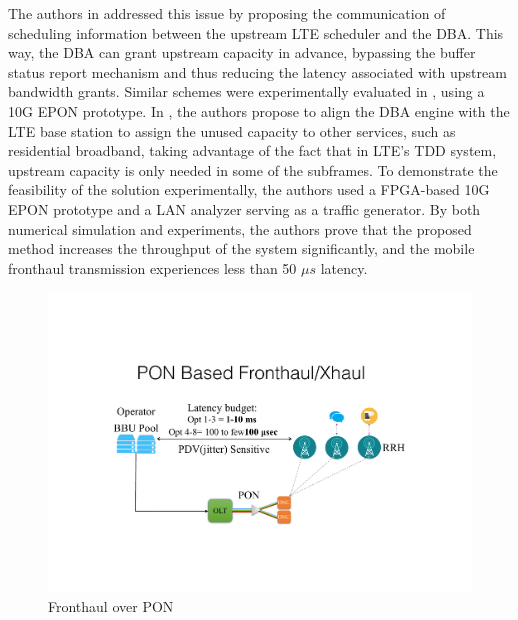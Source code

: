 The authors in \cite{6886953} addressed this issue by proposing the communication of scheduling information between the upstream \ac{LTE} scheduler and the \ac{DBA}. This way, the \ac{DBA} can grant upstream capacity in advance, bypassing the buffer status report mechanism and thus reducing the latency associated with upstream bandwidth grants. Similar schemes were experimentally evaluated in \cite{7936876}, using a 10G \ac{EPON} prototype.
In \cite{Hisano2016icc, Hisano2016ecoc}, the authors propose to align the \ac{DBA} engine with the \ac{LTE} base station to assign the unused capacity to other services, such as residential broadband, taking advantage of the fact that in \ac{LTE}'s \ac{TDD} system, upstream capacity is only needed in some of the subframes. To demonstrate the feasibility of the solution experimentally, the authors used a \ac{FPGA}-based 10G \ac{EPON} prototype and a \ac{LAN} analyzer serving as a traffic generator. By both numerical simulation and experiments, the authors prove that the proposed method increases the throughput of the system significantly, and the mobile fronthaul transmission experiences less than 50 $\mu s$ latency.
\begin{figure}
      \centering
      \includegraphics[width=0.8\columnwidth]{Figures/fronthaul.pdf}
      \caption{Fronthaul over \ac{PON}}
      \label{fig:fronthaul}
 \end{figure}


